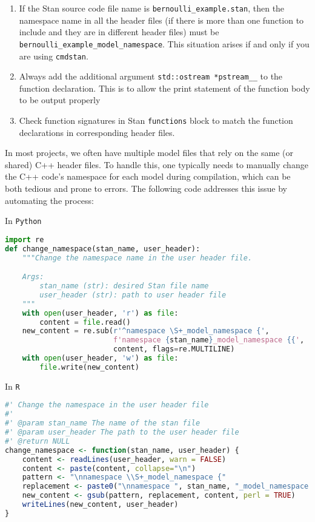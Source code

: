 \documentclass[11pt]{article}
\begin{document}
\begin{enumerate}
	\item If the Stan source code file name is \verb|bernoulli_example.stan|, then the namespace name in all the header files (if there is more than one function to include and they are in different header files) must be \verb|bernoulli_example_model_namespace|. This situation arises if and only if you are using \verb|cmdstan|.
	\item Always add the additional argument \verb|std::ostream *pstream__| to the function declaration. This is to allow the print statement of the function body to be output properly
	\item  Check function signatures in Stan \verb|functions| block to match the function declarations in corresponding header files.
\end{enumerate}


In most projects, we often have multiple model files that rely on the same (or shared) C++ header files. To handle this, one typically needs to manually change the C++ code's namespace for each model during compilation, which can be both tedious and prone to errors. The following code addresses this issue by automating the process:



In \verb|Python|
\begin{lstlisting}[language=py, style=lgeneral]
import re
def change_namespace(stan_name, user_header):
    """Change the namespace name in the user header file.

    Args:
        stan_name (str): desired Stan file name
        user_header (str): path to user header file
    """
    with open(user_header, 'r') as file:
        content = file.read()
    new_content = re.sub(r'^namespace \S+_model_namespace {',
                         f'namespace {stan_name}_model_namespace {{',
                         content, flags=re.MULTILINE)
    with open(user_header, 'w') as file:
        file.write(new_content)
\end{lstlisting}


In \verb|R|
\begin{lstlisting}[language=R, style=lgeneral]
#' Change the namespace in the user header file
#'
#' @param stan_name The name of the stan file
#' @param user_header The path to the user header file
#' @return NULL
change_namespace <- function(stan_name, user_header) {
    content <- readLines(user_header, warn = FALSE)
    content <- paste(content, collapse="\n")
    pattern <- "\nnamespace \\S+_model_namespace {"
    replacement <- paste0("\nnamespace ", stan_name, "_model_namespace {")
    new_content <- gsub(pattern, replacement, content, perl = TRUE)
    writeLines(new_content, user_header)
}

\end{lstlisting}
\end{document}
